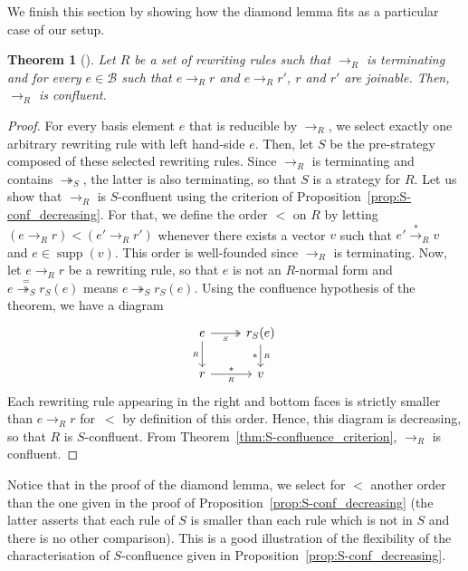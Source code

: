 \documentclass[10pt]{easychair}
\newtheorem{theorem}{Theorem}[section]
\theoremstyle{definition}
\DeclareMathOperator{\supp}{supp}
\newcommand\basis{\mathscr{B}}
\newcommand\rewR{\to_R}
\newcommand\rewS{\twoheadrightarrow_S}
\newcommand\transR{\overset{*}{\to}_R}
\begin{document}
We finish this section by showing how the diamond lemma fits as a
particular case of our setup.
\medskip

\begin{theorem}[\cite{MR506890}]\label{thm:diamond_lemma}
  Let $R$ be a set of rewriting rules such that $\rewR$ is terminating
  and for every $e\in\basis$ such that $e\rewR r$ and $e\rewR r'$, $r$
  and $r'$ are joinable. Then,~$\rewR$ is confluent.
\end{theorem}

\begin{proof}
  For every basis element $e$ that is reducible by $\rewR$, we select
  exactly one arbitrary rewriting rule with left hand-side
  $e$. Then, let $S$ be the pre-strategy composed of these selected
  rewriting rules. Since $\rewR$ is terminating and contains $\rewS$, the
  latter is also terminating, so that $S$ is a strategy for $R$. Let us
  show that $\rewR$ is $S$-confluent using the criterion of
  Proposition~\ref{prop:S-conf_decreasing}. For that, we define the order
  $<$ on $R$ by letting $(e\rewR r)<(e'\rewR r')$ whenever there exists a
  vector $v$ such that $e'\transR v$ and $e\in\supp(v)$. This order is
  well-founded since $\rewR$ is terminating. Now, let $e\rewR r$ be a
  rewriting rule, so that $e$ is not an $R$-normal form and
  $e\overset{=}{\rewS}r_S(e)$ means $e\rewS r_S(e)$. Using the confluence
  hypothesis of the theorem, we have a diagram
  \[\begin{tikzcd}
  e\ar[d, "_R"']\ar[r, twoheadrightarrow, "_S"'] &
  r_S(e)\ar[d, rightarrow, "*"', "_R"]\\
  r\ar[r, rightarrow, "*", "_R"'] & v
  \end{tikzcd}\]
  Each rewriting rule appearing in the right and bottom faces is strictly
  smaller than $e\rewR r$ for~$<$ by definition of this order. Hence,
  this diagram is decreasing, so that $R$ is $S$-confluent. From 
  Theorem~\ref{thm:S-confluence_criterion}, $\rewR$ is confluent.   
\end{proof}
\smallskip

Notice that in the proof of the diamond lemma, we select for $<$ another order
than the one given in the proof of Proposition~\ref{prop:S-conf_decreasing} (the
latter asserts that each rule of $S$ is smaller than each rule which is not in
$S$ and there is no other comparison). This is a good illustration of the
flexibility of the characterisation of $S$-confluence given in
Proposition~\ref{prop:S-conf_decreasing}.

\end{document}
